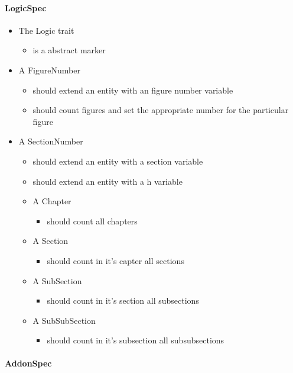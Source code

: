 \paragraph{LogicSpec}

\begin{itemize}
\item The Logic trait
\begin{itemize}
  \item is a abstract marker
\end{itemize}
\item A FigureNumber
\begin{itemize}
  \item should extend an entity with an figure number variable
  \item should count figures and set the appropriate number for the particular figure
\end{itemize}
\item A SectionNumber
\begin{itemize}
  \item should extend an entity with a section variable
  \item should extend an entity with a h variable
  \item A Chapter
  \begin{itemize}
    \item should count all chapters
  \end{itemize}
  \item A Section
  \begin{itemize}
    \item should count in it's capter all sections
  \end{itemize}
  \item A SubSection 
  \begin{itemize}
    \item should count in it's section all subsections
  \end{itemize}
  \item A SubSubSection
  \begin{itemize}
    \item should count in it's subsection all subsubsections
  \end{itemize}
\end{itemize}
\end{itemize}

\paragraph{AddonSpec}

